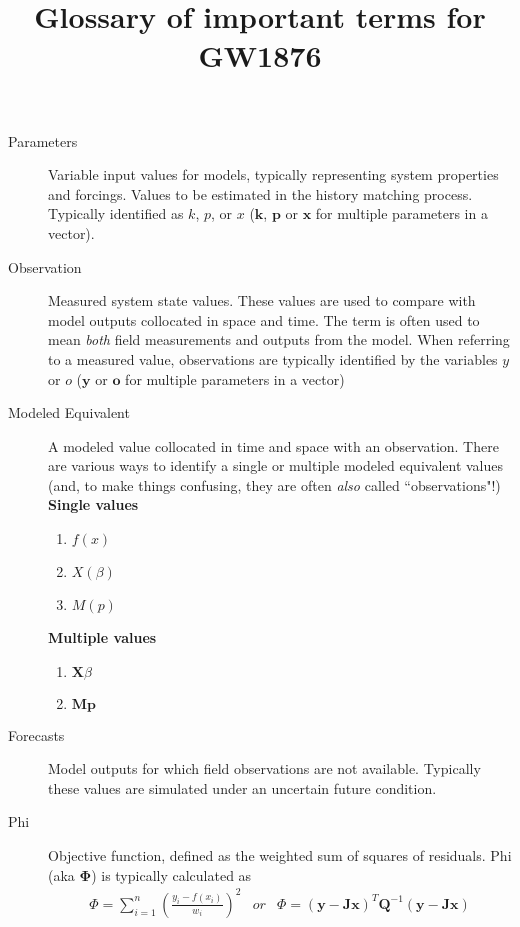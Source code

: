 \documentclass[english]{article}
\begin{document}
\title{Glossary of important terms for GW1876}
\maketitle

\begin{description}
\item [Parameters] Variable input values for models, typically representing system properties and forcings. Values to be estimated in the history matching process. Typically identified as $k$, $p$, or $x$ ($\mathbf{k}$, $\mathbf{p}$ or $\mathbf{x}$ for multiple parameters in a vector).
\item [Observation] Measured system state values. These values are used to compare with model outputs collocated in space and time. The term is often used to mean \emph{both} field measurements and outputs from the model. When referring to a measured value, observations are typically identified by the variables $y$ or $o$  ($\mathbf{y}$ or $\mathbf{o}$ for multiple parameters in a vector)
\item [Modeled Equivalent] A modeled value collocated in time and space with an observation. There are various ways to identify a single or multiple modeled equivalent values (and, to make things confusing, they are often \emph{also} called ``observations"!)  \newline{}
\textbf{Single values} 
\begin{enumerate}
\item $f\left(x\right)$
\item $X\left(\beta\right)$
\item $M\left(p\right)$
\end{enumerate}
\textbf{Multiple values}
\begin{enumerate}
\item $\mathbf{X}\beta$
\item $\mathbf{M}\mathbf{p}$
\end{enumerate}
\item [Forecasts] Model outputs for which field observations are not available. Typically these values are simulated under an uncertain future condition.
\item [Phi] Objective function, defined as the weighted sum of squares of residuals. Phi (aka $\mathbf{\Phi}$) is typically calculated as
\begin{equation}
\begin{array}{ccc}
 \Phi=\sum_{i=1}^{n}\left(\frac{y_{i}-f\left(x_{i}\right)}{w_{i}}\right)^{2} & or & \Phi=\left(\mathbf{y}-\mathbf{Jx}\right)^{T}\mathbf{Q}^{-1}\left(\mathbf{y}-\mathbf{Jx}\right)

\end{array}
\end{equation}
\end{description}
\end{document}

